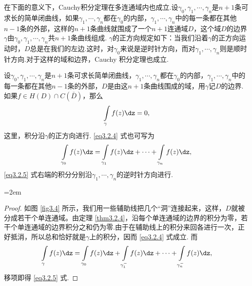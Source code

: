 在下面的意义下，Cauchy积分定理在多连通域内也成立.设$\gamma_0,\gamma_1,\cdots,\gamma_n$是$n+1$条可求长的简单闭曲线，如果$\gamma_1,\cdots,\gamma_n$都在$\gamma_0$的内部，$\gamma_1,\cdots,\gamma_n$中的每一条都在其他$n-1$条的外部，这样的$n+1$条曲线就围成了一个$n+1$连通域$D$，这个域$D$的边界$\gamma$由$\gamma_0,\gamma_1,\cdots,\gamma_n$共$n+1$条曲线组成. $\gamma$的正方向规定如下：当我们沿着$\gamma$的正方向运动时，$D$总是在我们的左边.这时，对$\gamma_0$来说是逆时针方向，而对$\gamma_1,\cdots,\gamma_n$则是顺时针方向.对于这样的域和边界，Cauchy 积分定理也成立.
\begin{theorem}\label{thm3.2.5}
设$\gamma_0,\gamma_1,\cdots,\gamma_n$是$n+1$条可求长简单闭曲线，$\gamma_1,\cdots,\gamma_n$都在$\gamma_0$的内部，$\gamma_1,\cdots,\gamma_n$中的每一条都在其他$n-1$条的外部，$D$是由这$n+1$条曲线围成的域，用$\gamma$记$D$的边界.如果$f\in H(D)\cap C(\bar D)$，那么
\begin{equation}\label{eq3.2.4}
\int\limits_\gamma f(z)\dz=0,
\end{equation}
这里，积分沿$\gamma$的正方向进行. \eqref{eq3.2.4} 式也可写为
\begin{equation}\label{eq3.2.5}
\int\limits_{\gamma_0}f(z)\dz=\int\limits_{\gamma_1}f(z)\dz+
\cdots+\int\limits_{\gamma_n}f(z)\dz,
\end{equation}
\eqref{eq3.2.5} 式右端的积分分别沿$\gamma_1,\cdots,\gamma_n$的逆时针方向进行.
\end{theorem}
\noindent\begin{minipage}{0.65\textwidth}
\parindent=2em
\begin{proof}
如图 \ref{fig3.4} 所示，我们用一些辅助线把几个``洞''连接起来，这样，$D$就被分成若干个单连通域。由定理 \ref{thm3.2.4}，沿每个单连通域的边界的积分为零，若干个单连通域的边界积分之和仍为零.由于在辅助线上的积分来回各进行一次，正好抵消，所以总和恰好就是$\gamma$上的积分，因而 \eqref{eq3.2.4} 式成立.
而
\begin{equation*}
\int\limits_{\gamma}f(z)\dz=\int\limits_{\gamma_0}f(z)\dz+\int\limits_{\gamma_1^-}f(z)\dz+
\cdots+\int\limits_{\gamma_n^-}f(z)\dz,
\end{equation*}
移项即得 \eqref{eq3.2.5} 式.
\end{proof}
\end{minipage}
